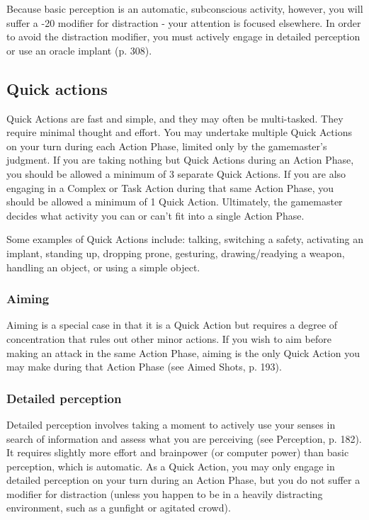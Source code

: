 Because basic perception is an automatic, subconscious activity, however, you will suffer a -20 modifier for distraction - your attention is focused elsewhere. In order to avoid the distraction modifier, you must actively engage in detailed perception or use an oracle implant (p. 308).


\subsection{Quick actions}
\label{sec:combat-quick-actions}

Quick Actions are fast and simple, and they may often be multi-tasked. They require minimal thought and effort. You may undertake multiple Quick Actions on your turn during each Action Phase, limited only by the gamemaster’s judgment. If you are taking nothing but Quick Actions during an Action Phase, you should be allowed a minimum of 3 separate Quick Actions. If you are also engaging in a Complex or Task Action during that same Action Phase, you should be allowed a minimum of 1 Quick Action. Ultimately, the gamemaster decides what activity you can or can’t fit into a single Action Phase.

Some examples of Quick Actions include: talking, switching a safety, activating an implant, standing up, dropping prone, gesturing, drawing/readying a weapon, handling an object, or using a simple object.


\subsubsection{Aiming}

Aiming is a special case in that it is a Quick Action but requires a degree of concentration that rules out other minor actions. If you wish to aim before making an attack in the same Action Phase, aiming is the only Quick Action you may make during that Action Phase (see Aimed Shots, p. 193).

\subsubsection{Detailed perception}

Detailed perception involves taking a moment to actively use your senses in search of information and assess what you are perceiving (see Perception, p. 182). It requires slightly more effort and brainpower (or computer power) than basic perception, which is automatic. As a Quick Action, you may only engage in detailed perception on your turn during an Action Phase, but you do not suffer a modifier for distraction (unless you happen to be in a heavily distracting environment, such as a gunfight or agitated crowd).


